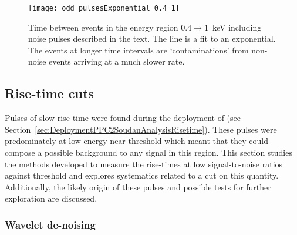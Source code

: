 			\begin{figure}
				\centering
				\texttt{[image: odd\_pulsesExponential\_0.4\_1]}
				\caption[Time between noise pulses]
				{Time between events in the energy region $0.4\to1$~keV including noise pulses described in the text. 
				 The line is a fit to an exponential.  The events at longer time intervals are `contaminations' from non-noise
				 events arriving at a much slower rate.}
				\label{fig:OddPulseRate}
			\end{figure}
				
		\subsection{Rise-time cuts}
	     	\label{sec:RisetimeCuts}	

	Pulses of slow rise-time were found during the deployment of  (see Section~\ref{sec:DeploymentPPC2SoudanAnalysisRisetime}).  These pulses were predominately at low energy near threshold which meant that they could compose a possible background to any signal in this region.  This section studies the methods developed to measure the rise-times at low signal-to-noise ratios against threshold and explores systematics related to a cut on this quantity.  Additionally, the likely origin of these pulses and possible tests for further exploration are discussed. 
	
			\subsubsection{Wavelet de-noising}
		     	\label{sec:RisetimeCutsWaveletDenoise}
					
